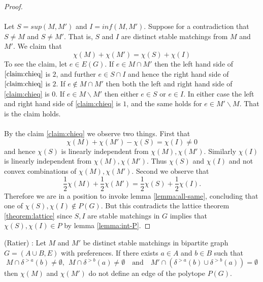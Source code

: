 \begin{proof}
\paragraph{}
Let $S = sup(M,M')$ and $I = inf(M,M')$. Suppose for a contradiction that $S \neq M$ and $S \neq M'$. That is, $S$ and $I$ are distinct stable matchings from $M$ and $M'$. We claim that
\begin{equation} \label{claim:chieq}
\chi(M) + \chi(M') = \chi(S) + \chi(I)
 \end{equation}
To see the claim, let $e \in E(G)$. If $e \in M \cap M'$ then the left hand side of $\ref{claim:chieq}$ is $2$, and further $e \in S \cap I$ and hence the right hand side of $\ref{claim:chieq}$ is $2$. If $e \not\in M \cap M'$ then both the left and right hand side of \ref{claim:chieq} is $0$. If $e \in M \backslash M'$ then either $e \in S$ or $e \in I$. In either case the left and right hand side of \ref{claim:chieq} is $1$, and the same holds for $e \in M' \backslash M$. That is the claim holds.
\paragraph{}
By the claim \ref{claim:chieq} we observe two things. First that
$$ \chi(M) + \chi(M') - \chi(S) = \chi(I) \neq 0$$
and hence $\chi(S)$ is linearly independent from $\chi(M), \chi(M')$. Similarly $\chi(I)$ is linearly independent from $\chi(M), \chi(M')$. Thus $\chi(S)$ and $\chi(I)$ and not convex combinations of $\chi(M), \chi(M')$. Second we observe that $$\frac{1}{2}\chi(M) + \frac{1}{2} \chi(M') = \frac{1}{2} \chi(S) + \frac{1}{2} \chi(I).$$
Therefore we are in a position to invoke lemma \ref{lemma:all-same}, concluding that one of $\chi(S), \chi(I) \not\in P(G)$. But this contradicts the lattice theorem \ref{theorem:lattice} since $S, I$ are stable matchings in $G$ implies that $\chi(S), \chi(I) \in P$  by lemma \ref{lemma:int-P}.
\end{proof}
\begin{corollary}\label{cor:edge} (Ratier) \cite{ratier1996stable}:
Let $M$ and $M'$ be distinct stable matchings in bipartite graph $G=(A\cup B, E)$ with preferences. If there exists $a \in A$ and $b \in B$ such that
\begin{equation}\label{cond:nonedge}
M \cap \delta^{>a}(b) \neq \emptyset,\ \ M\cap \delta^{>b}(a) \neq \emptyset \quad\text{and}\quad M' \cap(\delta^{>a}(b) \cup \delta^{>b}(a)) = \emptyset \end{equation}
then $\chi(M)$ and $\chi(M')$ do not define an edge of the polytope $P(G)$.
\end{corollary}
